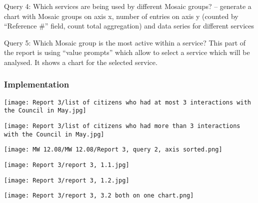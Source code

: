 Query 4: Which services are being used by different Mosaic groups? – generate a chart with Mosaic groups on axis x, number of entries on axis y (counted by “Reference \#” field, count total aggregation) and data series for different services

Query 5: Which Mosaic group is the most active within a service? This part of the report is using “value prompts” which allow to select a service which will be analysed. It shows a chart for the selected service.
			
			\subsubsection{Implementation}
			
			
\begin{center}
  \texttt{[image: Report 3/list of citizens who had at most 3 interactions with the Council in May.jpg]}
  \label{normal_case}
\end{center}
			

\begin{center}
  \texttt{[image: Report 3/list of citizens who had more than 3 interactions with the Council in May.jpg]}
  \label{normal_case}
\end{center}



\begin{center}
  \texttt{[image: MW 12.08/MW 12.08/Report 3, query 2, axis sorted.png]}
  \label{normal_case}
\end{center}


\begin{center}
  \texttt{[image: Report 3/report 3, 1.1.jpg]}
  \label{normal_case}
\end{center}








\begin{center}
  \texttt{[image: Report 3/report 3, 1.2.jpg]}
  \label{normal_case}
\end{center}


\begin{center}
  \texttt{[image: Report 3/report 3, 3.2 both on one chart.png]}
  \label{normal_case}
\end{center}


